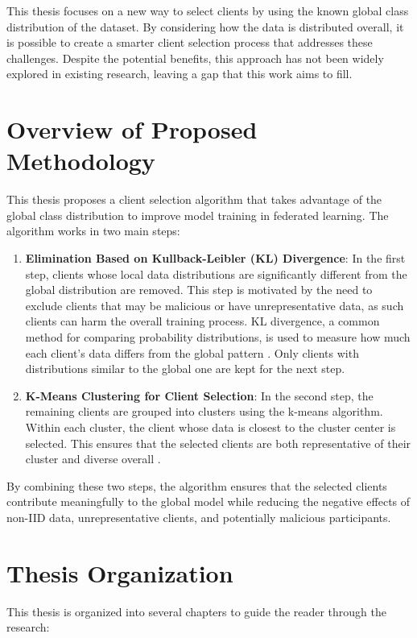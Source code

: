 This thesis focuses on a new way to select clients by using the known global class distribution of the dataset. By considering how the data is distributed overall, it is possible to create a smarter client selection process that addresses these challenges. Despite the potential benefits, this approach has not been widely explored in existing research, leaving a gap that this work aims to fill.

\section{Overview of Proposed Methodology}
This thesis proposes a client selection algorithm that takes advantage of the global class distribution to improve model training in federated learning. The algorithm works in two main steps:

\begin{enumerate}
    \item \textbf{Elimination Based on Kullback-Leibler (KL) Divergence}: In the first step, clients whose local data distributions are significantly different from the global distribution are removed. This step is motivated by the need to exclude clients that may be malicious or have unrepresentative data, as such clients can harm the overall training process. KL divergence, a common method for comparing probability distributions, is used to measure how much each client's data differs from the global pattern \cite{hershey2007approximating}. Only clients with distributions similar to the global one are kept for the next step.
    \item \textbf{K-Means Clustering for Client Selection}: In the second step, the remaining clients are grouped into clusters using the k-means algorithm. Within each cluster, the client whose data is closest to the cluster center is selected. This ensures that the selected clients are both representative of their cluster and diverse overall \cite{lloyd1982least}.
\end{enumerate}

By combining these two steps, the algorithm ensures that the selected clients contribute meaningfully to the global model while reducing the negative effects of non-IID data, unrepresentative clients, and potentially malicious participants.

\section{Thesis Organization}
This thesis is organized into several chapters to guide the reader through the research:

